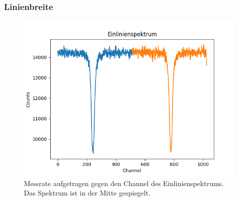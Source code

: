 \documentclass[12pt,a4paper]{article}
\begin{document}
\subsubsection{Linienbreite}
\begin{figure}
\centering
\includegraphics[scale=0.8]{Bilder/Einlinien/Ein_Rohdaten.png}
\caption{Messrate aufgetragen gegen den Channel des Einlinienspektrums. Das Spektrum ist in der Mitte gespiegelt.}
\label{fig:Ein_Roh}
\end{figure}
\end{document}
